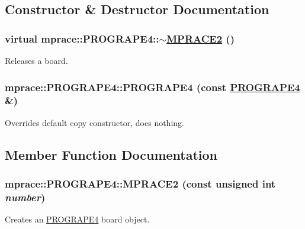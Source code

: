 \subsection{Constructor \& Destructor Documentation}
\hypertarget{classmprace_1_1PROGRAPE4_a1}{
\subsubsection[$\sim$MPRACE2]{\setlength{\rightskip}{0pt plus 5cm}virtual mprace::PROGRAPE4::$\sim$\hyperlink{classmprace_1_1MPRACE2}{MPRACE2} ()}}
\label{classmprace_1_1PROGRAPE4_a1}


Releases a board. 

\hypertarget{classmprace_1_1PROGRAPE4_b0}{
\subsubsection[PROGRAPE4]{\setlength{\rightskip}{0pt plus 5cm}mprace::PROGRAPE4::PROGRAPE4 (const \hyperlink{classmprace_1_1PROGRAPE4}{PROGRAPE4} \&)}}
\label{classmprace_1_1PROGRAPE4_b0}


Overrides default copy constructor, does nothing. 



\subsection{Member Function Documentation}
\hypertarget{classmprace_1_1PROGRAPE4_a0}{
\subsubsection[MPRACE2]{\setlength{\rightskip}{0pt plus 5cm}mprace::PROGRAPE4::MPRACE2 (const unsigned int {\em number})}}
\label{classmprace_1_1PROGRAPE4_a0}


Creates an \hyperlink{classmprace_1_1PROGRAPE4}{PROGRAPE4} board object. 

